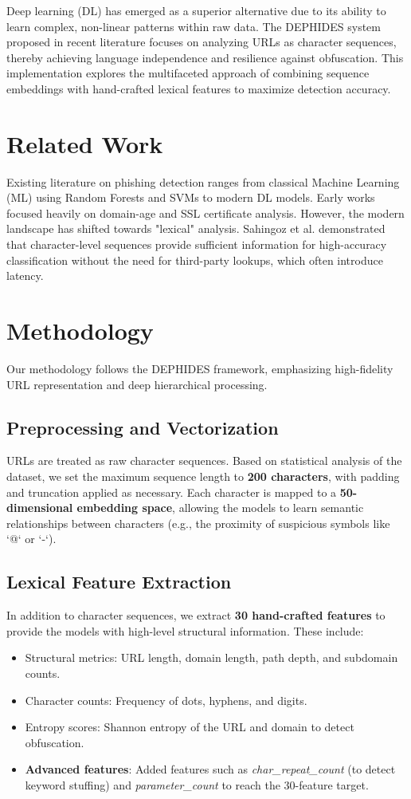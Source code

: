 \documentclass[journal,twocolumn]{IEEEtran}
\begin{document}
Deep learning (DL) has emerged as a superior alternative due to its ability to learn complex, non-linear patterns within raw data. The DEPHIDES system proposed in recent literature focuses on analyzing URLs as character sequences, thereby achieving language independence and resilience against obfuscation. This implementation explores the multifaceted approach of combining sequence embeddings with hand-crafted lexical features to maximize detection accuracy.

\section{Related Work}
Existing literature on phishing detection ranges from classical Machine Learning (ML) using Random Forests and SVMs to modern DL models. Early works focused heavily on domain-age and SSL certificate analysis. However, the modern landscape has shifted towards "lexical" analysis. Sahingoz et al. demonstrated that character-level sequences provide sufficient information for high-accuracy classification without the need for third-party lookups, which often introduce latency. 

\section{Methodology}
Our methodology follows the DEPHIDES framework, emphasizing high-fidelity URL representation and deep hierarchical processing.

\subsection{Preprocessing and Vectorization}
URLs are treated as raw character sequences. Based on statistical analysis of the dataset, we set the maximum sequence length to \textbf{200 characters}, with padding and truncation applied as necessary. Each character is mapped to a \textbf{50-dimensional embedding space}, allowing the models to learn semantic relationships between characters (e.g., the proximity of suspicious symbols like `@` or `-`).

\subsection{Lexical Feature Extraction}
In addition to character sequences, we extract \textbf{30 hand-crafted features} to provide the models with high-level structural information. These include:
\begin{itemize}
    \item Structural metrics: URL length, domain length, path depth, and subdomain counts.
    \item Character counts: Frequency of dots, hyphens, and digits.
    \item Entropy scores: Shannon entropy of the URL and domain to detect obfuscation.
    \item \textbf{Advanced features}: Added features such as \textit{char\_repeat\_count} (to detect keyword stuffing) and \textit{parameter\_count} to reach the 30-feature target.
\end{itemize}
\end{document}
